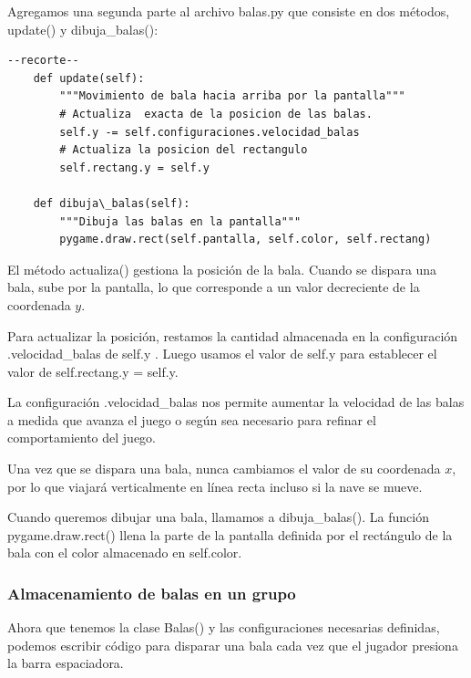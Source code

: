 Agregamos una segunda parte al archivo  {\ttfamily balas.py} que consiste en dos métodos, {\ttfamily update()} y {\ttfamily dibuja\_balas()}:

\hspace{-2.3cm}{\ttfamily \scriptsize  balas.py} \vspace{-0.5cm}
\begin{lstlisting}
--recorte--		
    def update(self):
        """Movimiento de bala hacia arriba por la pantalla"""
        # Actualiza  exacta de la posicion de las balas.
        self.y -= self.configuraciones.velocidad_balas
        # Actualiza la posicion del rectangulo
        self.rectang.y = self.y
    
    def dibuja\_balas(self):
        """Dibuja las balas en la pantalla"""
        pygame.draw.rect(self.pantalla, self.color, self.rectang)
\end{lstlisting}

El método {\ttfamily actualiza()} gestiona la posición de la bala. Cuando se dispara una bala, sube por la pantalla, 
lo que corresponde a un valor decreciente de la coordenada $y$. 

Para actualizar la posición, restamos la cantidad almacenada en la configuración {\ttfamily .velocidad\_balas} de {\ttfamily self.y }. Luego usamos el valor de {\ttfamily self.y} para establecer el valor de {\ttfamily self.rectang.y = self.y}.

La configuración {\ttfamily .velocidad\_balas}  nos permite aumentar la velocidad de las balas a medida que avanza el juego o según sea necesario para refinar el comportamiento del juego.

Una vez que se dispara una bala, nunca cambiamos el valor de su coordenada $x$, por lo que viajará verticalmente en línea recta incluso si la nave se mueve.

Cuando queremos dibujar una bala, llamamos a {\ttfamily dibuja\_balas()}. La función {\ttfamily pygame.draw.rect()} llena la parte de la pantalla definida por el rectángulo de la bala con el color almacenado en {\ttfamily self.color}.

\subsubsection{Almacenamiento de balas en un grupo}

Ahora que tenemos la clase  {\ttfamily Balas()}  y las configuraciones necesarias definidas, podemos escribir código para
disparar una bala cada vez que el jugador presiona la barra espaciadora.

